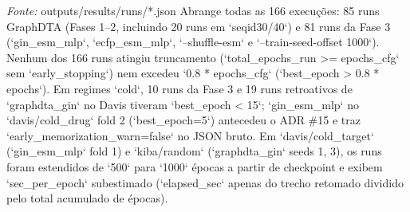 \begin{table}[htbp]
\begin{tabular}{lllllllllllllllllll}
\bottomrule
\end{tabular}
\begin{flushleft}
\footnotesize \textit{Fonte:} outputs/results/runs/*.json Abrange todas as 166 execuções: 85 runs GraphDTA (Fases 1–2, incluindo 20 runs em `seqid30/40`) e 81 runs da Fase 3 (`gin\_esm\_mlp`, `ecfp\_esm\_mlp`, `--shuffle-esm` e `--train-seed-offset 1000`). Nenhum dos 166 runs atingiu truncamento (`total\_epochs\_run >= epochs\_cfg` sem `early\_stopping`) nem excedeu `0.8 * epochs\_cfg` (`best\_epoch > 0.8 * epochs`). Em regimes `cold`, 10 runs da Fase 3 e 19 runs retroativos de `graphdta\_gin` no Davis tiveram `best\_epoch < 15`; `gin\_esm\_mlp` no `davis/cold\_drug` fold 2 (`best\_epoch=5`) antecedeu o ADR \#15 e traz `early\_memorization\_warn=false` no JSON bruto. Em `davis/cold\_target` (`gin\_esm\_mlp` fold 1) e `kiba/random` (`graphdta\_gin` seeds 1, 3), os runs foram estendidos de `500` para `1000` épocas a partir de checkpoint e exibem `sec\_per\_epoch` subestimado (`elapsed\_sec` apenas do trecho retomado dividido pelo total acumulado de épocas).
\end{flushleft}
\end{table}
